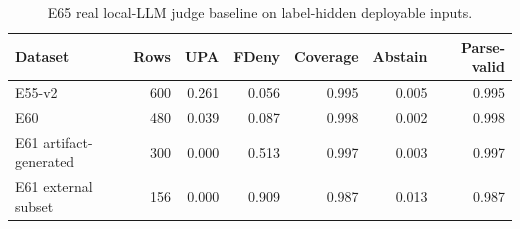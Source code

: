\begin{table}[t]
\centering
\caption{E65 real local-LLM judge baseline on label-hidden deployable inputs.}
\label{tab:e65-real-llm-judge}
\begin{tabular}{lrrrrrr}
\toprule
Dataset & Rows & UPA & FDeny & Coverage & Abstain & Parse-valid \\
\midrule
E55-v2 & 600 & 0.261 & 0.056 & 0.995 & 0.005 & 0.995 \\
E60 & 480 & 0.039 & 0.087 & 0.998 & 0.002 & 0.998 \\
E61 artifact-generated & 300 & 0.000 & 0.513 & 0.997 & 0.003 & 0.997 \\
E61 external subset & 156 & 0.000 & 0.909 & 0.987 & 0.013 & 0.987 \\
\bottomrule
\end{tabular}
\end{table}
